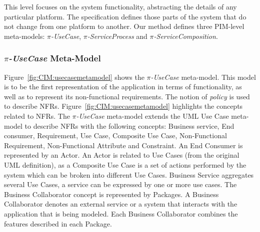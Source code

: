 \documentclass{singlecol-new}
\theoremstyle{TH}{
\newtheorem{lemma}{Lemma}
\newtheorem{theorem}[lemma]{Theorem}
\newtheorem{corrolary}[lemma]{Corrolary}
\newtheorem{conjecture}[lemma]{Conjecture}
\newtheorem{proposition}[lemma]{Proposition}
\newtheorem{claim}[lemma]{Claim}
\newtheorem{stheorem}[lemma]{Wrong Theorem}
\newtheorem{algorithm}{Algorithm}
}
\theoremstyle{THrm}{
\newtheorem{definition}{Definition}[section]
\newtheorem{question}{Question}[section]
\newtheorem{remark}{Remark}
\newtheorem{scheme}{Scheme}
}
\theoremstyle{THhit}{
\newtheorem{case}{Case}[section]
}
\theoremstyle{THhsl}{
\newtheorem{example}{Example}
}
\begin{document}
This level focuses on the system functionality, abstracting the details of any particular platform.
The specification defines those parts of the system that do not change from one platform to another.
Our method defines three PIM-level meta-models: \textit{$\pi$-UseCase}, \textit{$\pi$-Ser\-vice\-Pro\-cess} and \textit{$\pi$-ServiceComposition}.

\subsubsection{\textit{$\pi$-UseCase} Meta-Model}

Figure~\ref{fig:CIM:usecasemetamodel} shows the \textit{$\pi$-UseCase} meta-model.
This model is  to be the first representation of the application in terms of functionality, as well as to represent its non-func\-tion\-al requirements.
The notion of \textit{policy} is used to describe NFRs.
Figure~\ref{fig:CIM:usecasemetamodel} highlights the concepts related to NFRs.
The \textit{$\pi$-UseCase} meta-model extends the UML Use Case meta-model to describe NFRs with  the following  concepts:  {\sc Business service}\footnotemark {}, {\sc End consumer}, {\sc Requirement}, {\sc Use Case}, {\sc Composite Use Case}, {\sc Non-\-Func\-tion\-al Requirement}, {\sc Non-Functional} {\sc At\-tri\-bute} and {\sc Constraint}.
An {\sc End Consumer} is represented by an {\sc Actor}.
An  {\sc Actor} is related to {\sc Use Cases} (from the original UML definition), as a {\sc  Composite Use Case} is a set of actions performed by the system which can be broken into different {\sc Use Cases}.
{\sc  Business Service} aggregates several {\sc Use Cases},  a service can be expressed by one or more use cases.
 The {\sc Business Collaborator} concept is represented  by {\sc Packages}.
A {\sc Business Collaborator} denotes an external service or a system that interacts with the application that is being modeled.
Each {\sc Business Collaborator} combines the features described in each  {\sc Package}.
\end{document}
